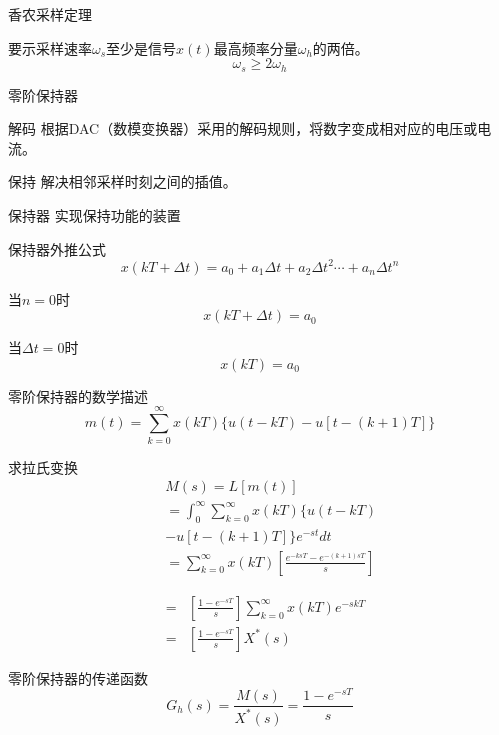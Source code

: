 \begin{frame}{香农采样定理}
\begin{block}{}
要示采样速率$\omega_s$至少是信号$x(t)$最高频率分量$\omega_h$的两倍。
\[\omega_s\geq 2\omega_h\]
\end{block}
\end{frame}
\begin{frame}{零阶保持器}
\begin{block}{解码}
根据DAC（数模变换器）采用的解码规则，将数字变成相对应的电压或电流。
\end{block}
\begin{block}{保持}
解决相邻采样时刻之间的插值。
\end{block}
\begin{block}{保持器}
实现保持功能的装置
\end{block}
\end{frame}
\begin{frame}
\begin{block}{保持器外推公式}
\[x(kT+\Delta t)=a_0+a_1\Delta t+a_2\Delta t^2\cdots+a_n\Delta t^n\]
\end{block}
\begin{block}{当$n=0$时}
\[x(kT+\Delta t)=a_0\]
\end{block}

\begin{block}{当$\Delta t=0$时}
\[x(kT)=a_0\]
\end{block}
\end{frame}

\begin{frame}
\begin{block}{零阶保持器的数学描述}
\begin{equation*}
m(t)=\sum\limits_{k=0}^\infty x(kT)\{u(t-kT)-u[t-(k+1)T]\}
\end{equation*}
\end{block}
\end{frame}
\begin{frame}
\begin{block}{求拉氏变换}
\begin{eqnarray*}
&&M(s)=L[m(t)]\\
&&=\int_0^\infty\sum\limits_{k=0}^\infty x(kT)\{u(t-kT)\\
&&-u[t-(k+1)T]\}e^{-st}dt\\
&&=\sum\limits_{k=0}^\infty x(kT)\left[\frac{e^{-ksT}-e^{-(k+1)sT}}{s}\right]
\end{eqnarray*}
\end{block}
\end{frame}
\begin{frame}
\begin{block}{}
\begin{eqnarray*}
&=&\left[\frac{1-e^{-sT}}{s}\right]\sum\limits_{k=0}^\infty x(kT)e^{-skT}\\
&=&\left[\frac{1-e^{-sT}}{s}\right]X^*(s)
\end{eqnarray*}
\end{block}
\begin{block}{零阶保持器的传递函数}
\[G_h(s)=\frac{M(s)}{X^*(s)}=\frac{1-e^{-sT}}{s}\]
\end{block}
\end{frame}